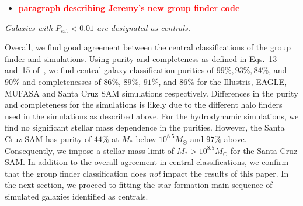 \documentclass[preprint2,tighten]{aastex62}
\newcommand{\todo}[1]{{\bf \textcolor{red}{ #1}}}
\begin{document}


\begin{itemize}
    \item \todo{paragraph describing Jeremy's new group finder code} 
\end{itemize}
\emph{Galaxies with $P_\mathrm{sat} < 0.01$ are designated as centrals.} 

Overall, we find good agreement between the central classifications of 
the group finder and simulations. Using purity and completeness as defined 
in Eqs.~13 and~15 of~\cite{campbell2015}, we find central galaxy classification purities of 
$99\%, 93\%, 84\%$, and $90\%$ and completenesses of $86\%$, $89\%$, 
$91\%$, and $86\%$  for the Illustris, EAGLE, MUFASA and Santa Cruz SAM 
simulations respectively. Differences in the purity and completeness for the 
simulations is likely due to the different halo finders used in the 
simulations as described above. For the hydrodynamic simulations, we find no 
significant stellar mass dependence in the purities. However, the Santa 
Cruz SAM has purity of $44\%$ at $M_*$ below $10^{8.5}M_\odot$ and $97\%$ 
above. Consequently, we impose a stellar mass limit of $M_* > 10^{8.5} M_\odot$
for the Santa Cruz SAM. In addition to the overall agreement in central 
classifications, we confirm that the group finder classification does \emph{not} 
impact the results of this paper. In the next section, we proceed to fitting 
the star formation main sequence of simulated galaxies identified as centrals.
\end{document}
